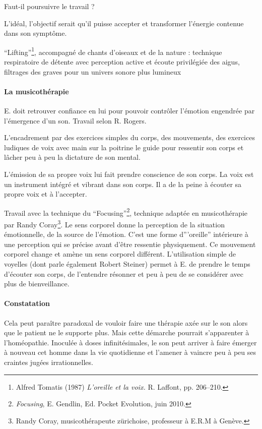 Faut-il poursuivre le travail ?

L'idéal, l'objectif serait qu'il puisse accepter et  transformer l'énergie
contenue dans son symptôme.

``Lifting''\footnote{Alfred Tomatis (1987) \emph{L'oreille et la
    voix.} R. Laffont, pp. 206--210.}, accompagné de chants d'oiseaux et
de la nature : technique respiratoire de détente avec perception
active et écoute privilégiée des aigus, filtrages des graves pour un
univers sonore plus lumineux

\paragraph{La musicothérapie}

E. doit retrouver confiance en lui pour pouvoir contrôler l'émotion
engendrée par l'émergence d'un son. Travail selon R. Rogers. 

L'encadrement par des exercices simples du corps, des mouvements,
des exercices ludiques de voix avec main sur la poitrine le guide
pour ressentir son corps et lâcher peu à peu la dictature de son mental.

L'émission de sa propre voix lui fait prendre conscience de son corps.
La voix est un instrument intégré et vibrant dans son corps. Il a
de la peine à écouter sa propre voix et à l'accepter.

Travail avec la technique du ``Focusing''\footnote{\emph{Focusing},
  E. Gendlin, Ed. Pocket Evolution, juin 2010.}, technique adaptée en
musicothérapie par Randy Coray\footnote{Randy Coray, musicothérapeute
  zürichoise, professeur à E.R.M à Genève.}. Le sens corporel donne la
perception de la situation émotionnelle, de la source de
l'émotion. C'est une forme d'''oreille'' intérieure à une perception
qui se précise avant d'être ressentie physiquement.  Ce mouvement
corporel change et amène un sens corporel différent.  L'utilisation
simple de voyelles (dont parle également Robert Steiner) permet à
E. de prendre le temps d'écouter son corps, de l'entendre résonner et
peu à peu de se considérer avec plus de bienveillance.

\paragraph{Constatation}

Cela peut paraître paradoxal de vouloir faire une thérapie axée sur
le son alors que le patient ne le supporte plus. Mais cette démarche
pourrait s'apparenter à l'homéopathie. Inoculée à doses infinitésimales,
le son peut arriver à faire émerger à nouveau cet homme dans la vie
quotidienne et l'amener à vaincre peu à peu ses craintes jugées irrationnelles.

